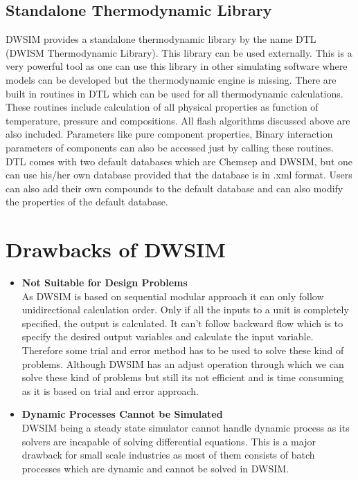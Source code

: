 \documentclass[12pt]{report}
\begin{document}
\subsection{Standalone Thermodynamic Library}
DWSIM provides a standalone thermodynamic library by the name DTL (DWISM Thermodynamic Library). This library can be used externally.
This is a very powerful tool as one can use this library in other simulating software where models can be developed but the thermodynamic engine is missing.
There are built in routines in DTL which can be used for all thermodynamic calculations. These routines include calculation of all physical properties as function of temperature, pressure and compositions. All flash algorithms discussed above are also included. Parameters like pure component properties, Binary interaction parameters of components can also be accessed just by calling these routines.
DTL comes with two default databases which are Chemsep and DWSIM, but one can use his/her own database provided that the database is in .xml format. Users can also add their own compounds to the default database and can also modify the properties of the default database.

\section{Drawbacks of DWSIM}
\begin{itemize}
\item {\textbf{Not Suitable for Design Problems}} \\
As DWSIM is based on sequential modular approach it can only follow unidirectional calculation order. Only if all the inputs to a unit is completely specified, the output is calculated. It can't follow backward flow which is to specify the desired output variables and calculate the input variable. Therefore some trial and error method has to be used to solve these kind of problems. Although DWSIM has an adjust operation through which we can solve these kind of problems but still its not efficient and is time consuming as it is based on trial and error approach.

\item{\textbf{Dynamic Processes Cannot be Simulated}} \\
DWSIM being a steady state simulator cannot handle dynamic process as its solvers are incapable of solving differential equations. This is a major drawback for small scale industries as most of them consists of batch processes which are dynamic and cannot be solved in DWSIM.

\end{itemize}
\end{document}
